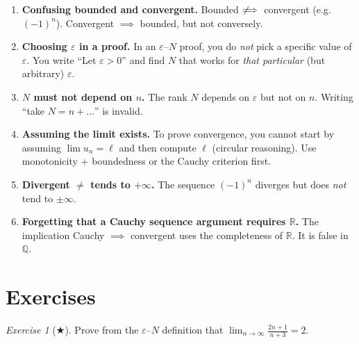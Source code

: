 \documentclass[12pt,a4paper,openany]{book}
\newcommand{\Q}{\mathbb{Q}}
\newcommand{\R}{\mathbb{R}}
\newcommand{\eps}{\varepsilon}
\theoremstyle{definition}
\theoremstyle{remark}
\newtheorem{exercise}{Exercise}[chapter]
\begin{document}
\begin{tcolorbox}[
   colback=red!3!white,
   colframe=red!60!black,
   title={\textbf{Common Errors --- Sequences}},
   fonttitle=\bfseries,
   arc=2mm
]
\begin{enumerate}
\item \textbf{Confusing bounded and convergent.}
      Bounded $\not\!\!\implies$ convergent (e.g.\ $(-1)^n$).
      Convergent $\implies$ bounded, but not conversely.

\item \textbf{Choosing $\eps$ in a proof.}
      In an $\eps$--$N$ proof, you do \emph{not} pick a specific value of
      $\eps$. You write ``Let $\eps > 0$'' and find $N$ that works for
      \emph{that particular} (but arbitrary) $\eps$.

\item \textbf{$N$ must not depend on $n$.}
      The rank $N$ depends on $\eps$ but not on $n$. Writing
      ``take $N = n + \ldots$'' is invalid.

\item \textbf{Assuming the limit exists.}
      To prove convergence, you cannot start by assuming $\lim u_n = \ell$
      and then compute $\ell$ (circular reasoning). Use monotonicity +
      boundedness or the Cauchy criterion first.

\item \textbf{Divergent $\neq$ tends to $+\infty$.}
      The sequence $(-1)^n$ diverges but does \emph{not} tend to $\pm\infty$.

\item \textbf{Forgetting that a Cauchy sequence argument requires $\R$.}
      The implication Cauchy $\implies$ convergent uses the completeness of $\R$.
      It is false in $\Q$.
\end{enumerate}
\end{tcolorbox}

\section{Exercises}\label{sec:seq-exercises}

\begin{exercise}[$\bigstar$]\label{exo:seq1}
Prove from the $\eps$--$N$ definition that
$\displaystyle\lim_{n\to\infty}\frac{2n+1}{n+3} = 2$.
\end{exercise}
\end{document}
